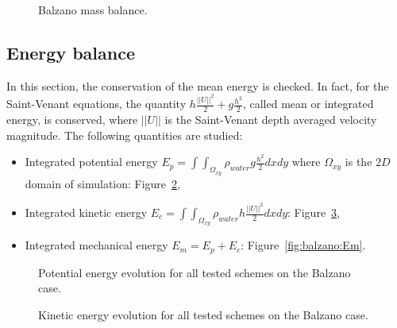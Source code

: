 \begin{figure}[h!]
  \centering
  \caption{Balzano mass balance.}\label{fig:balzano:massbalance}
\end{figure}

\subsection{Energy balance}

In this section, the conservation of the mean energy is checked.
In fact, for the Saint-Venant equations,
the quantity $h \frac{||U||^2}{2} + g \frac{h^2}{2}$, called mean or integrated
energy, is conserved,
where $||U||$ is the Saint-Venant depth averaged velocity magnitude.
The following quantities are studied:
\begin{itemize}
\item Integrated potential energy \textbf{$E_p =\int\int_{\Omega_{xy}}\rho_{water} g \frac{h^2}{2} dxdy$} where $\Omega_{xy}$ is the $2D$ domain of simulation: Figure~\ref{fig:balzano:Ep},
\item Integrated kinetic energy \textbf{$E_c =\int\int_{\Omega_{xy}} \rho_{water} h \frac{||U||^2}{2} dxdy$}: Figure~\ref{fig:balzano:Ec},
\item Integrated mechanical energy \textbf{$E_m = E_p + E_c$}: Figure~\ref{fig:balzano:Em}.
\end{itemize}

\begin{figure}[H]
  \centering
  \caption{Potential energy evolution for all tested schemes on the Balzano case.}
\label{fig:balzano:Ep}
\end{figure}

\begin{figure}[H]
  \centering
  \caption{Kinetic energy evolution for all tested schemes on the Balzano case.}
\label{fig:balzano:Ec}
\end{figure}

